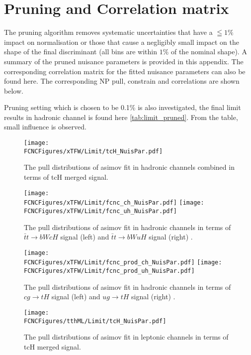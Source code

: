 \section{Pruning and Correlation matrix}
The pruning algorithm removes systematic uncertainties that have a  $\leqq 1\%$ impact on normalisation or those that cause a negligibly small impact on the shape of the final discriminant (all bins are within $1\%$ of the nominal shape). A summary of the pruned nuisance parameters is provided in this appendix.
The corresponding correlation matrix for the fitted nuisance parameters can also be found here. The corresponding NP pull, constrain and correlations are shown below.

Pruning setting  which is chosen to be 0.1\% is also investigated, the final limit results in hadronic channel is found here \ref{tab:limit_pruned}. From the table, small influence is observed.


\begin{figure}[H]
\centering
\texttt{[image: \\FCNCFigures/xTFW/Limit/tcH\_NuisPar.pdf]}
\caption{ The pull distributions of asimov fit in hadronic channels combined in terms of tcH merged signal.}
\label{fig:tcH_NuisPar}
\end{figure}

\begin{figure}[H]
\centering
\texttt{[image: \\FCNCFigures/xTFW/Limit/fcnc\_ch\_NuisPar.pdf]}
\texttt{[image: \\FCNCFigures/xTFW/Limit/fcnc\_uh\_NuisPar.pdf]}
\caption{ The pull distributions of asimov fit in hadronic channels in terms of $\bar{t}t\to bWcH$ signal (left) and $\bar{t}t\to bWuH$ signal (right) . }
\label{fig:fcnc_chuh_NuisPar}
\end{figure}

\begin{figure}[H]
\centering
\texttt{[image: \\FCNCFigures/xTFW/Limit/fcnc\_prod\_ch\_NuisPar.pdf]}
\texttt{[image: \\FCNCFigures/xTFW/Limit/fcnc\_prod\_uh\_NuisPar.pdf]}
\caption{ The pull distributions of asimov fit in hadronic channels  in terms of $cg\to tH$ signal (left) and $ug\to tH$ signal (right) . }
\label{fig:fcnc_prod_chuh_NuisPar}
\end{figure}


\begin{figure}[H]
\centering
\texttt{[image: \\FCNCFigures/tthML/Limit/tcH\_NuisPar.pdf]}
\caption{ The pull distributions of asimov fit in leptonic channels in terms of tcH merged signal. }
\label{fig:fcnc_tthml_ch_NuisPar}
\end{figure}


